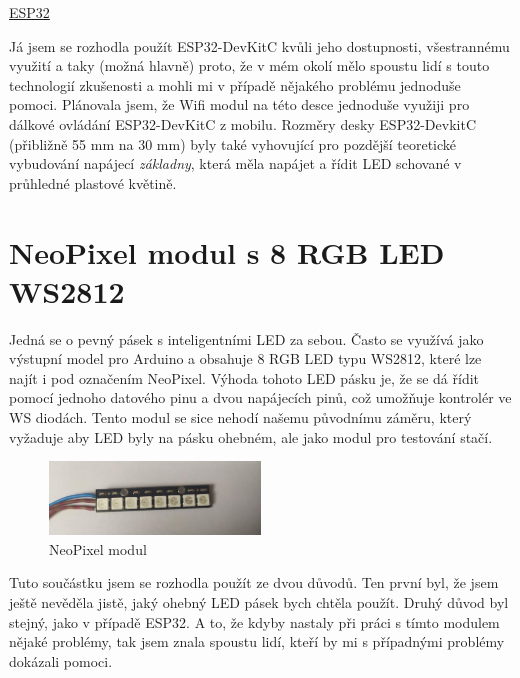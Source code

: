  \href{https://www.espressif.com/sites/default/files/documentation/esp32_datasheet_en.pdf}{ESP32}

Já jsem se rozhodla použít ESP32-DevKitC kvůli jeho dostupnosti, všestrannému využití a taky (možná hlavně) proto, že v mém okolí mělo spoustu lidí s touto technologií zkušenosti a mohli mi v případě nějakého problému jednoduše pomoci. 
Plánovala jsem, že Wifi modul na této desce jednoduše využiji pro dálkové ovládání ESP32-DevKitC z mobilu. Rozměry desky ESP32-DevkitC (přibližně 55 mm na 30 mm) byly také vyhovující pro pozdější teoretické vybudování napájecí \emph{základny}, která měla napájet a řídit LED schované v průhledné plastové květině.


\section{NeoPixel modul s 8 RGB LED WS2812}
Jedná se o pevný pásek s inteligentními LED za sebou. Často se využívá jako výstupní model pro Arduino a obsahuje 8 RGB LED typu WS2812,\cite {WS2812} které lze najít i pod označením NeoPixel\cite{Neopixel}. Výhoda tohoto LED pásku je, že se dá řídit pomocí jednoho datového pinu a dvou napájecích pinů, což umožňuje kontrolér ve WS diodách. Tento modul se sice nehodí našemu původnímu záměru, který vyžaduje aby LED byly na pásku ohebném, ale jako modul pro testování stačí.


\begin{figure}[htbp]
	\centering
	\includegraphics[width=0.5\textwidth]{img/NeoPixel2.jpg}
	\caption{NeoPixel modul}
\end{figure}

Tuto součástku jsem se rozhodla použít ze dvou důvodů. Ten první byl, že jsem ještě nevěděla jistě, jaký ohebný LED pásek bych chtěla použít. Druhý důvod byl stejný, jako v případě ESP32. A to, že kdyby nastaly při práci s tímto modulem nějaké problémy, tak jsem znala spoustu lidí, kteří by mi s případnými problémy dokázali pomoci.

